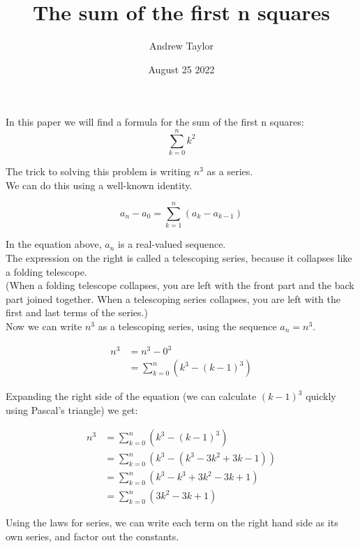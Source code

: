 \documentclass{article}
\title{The sum of the first n squares}
\author{Andrew Taylor}
\date{August 25 2022}
\begin{document}
\maketitle

In this paper we will find a formula for the sum of the first n squares: $$ \sum_{k=0}^{n} k^{2} $$

The trick to solving this problem is writing $n^3$ as a series. \\

We can do this using a well-known identity.

\begin{equation*}
a_{n} - a_{0} = \sum_{k=1}^{n} \left( a_{k} - a_{k-1} \right)
\end{equation*}

In the equation above, $a_{n}$ is a real-valued sequence. \\

The expression on the right is called a telescoping series, because it collapses like a folding telescope. \\

(When a folding telescope collapses, you are left with the front part and the back part joined together. When a telescoping series collapses, you are left with the first and last terms of the series.) \\

Now we can write $n^3$ as a telescoping series, using the sequence $a_{n} = n^{3}$.

\begin{align*}
n^3 &= n^3 - 0^3 \\
&= \sum_{k=0}^{n} \left( k^3 - (k-1)^3 \right)
\end{align*}

Expanding the right side of the equation (we can calculate $(k-1)^3$ quickly using Pascal's triangle) we get:

\begin{align*}
n^3 &= \sum_{k=0}^{n} \left( k^3 - (k-1)^3 \right) \\
&= \sum_{k=0}^{n} \left( k^3 - (k^3 - 3k^2 + 3k - 1) \right) \\
&= \sum_{k=0}^{n} \left( k^3 - k^3 + 3k^2 - 3k + 1 \right) \\
&= \sum_{k=0}^{n} \left( 3k^2 - 3k + 1 \right) 
\end{align*}

Using the laws for series, we can write each term on the right hand side as its own series, and factor out the constants. \\
\end{document}
